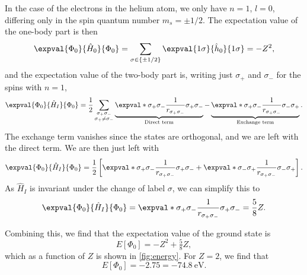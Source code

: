 In the case of the electrons in the helium atom, we only have $n = 1$, $l = 0$, differing only in the spin quantum number $m_s = \pm 1/2$.
The expectation value of the one-body part is then
\begin{equation*}
    \expval{\Phi_0}{\hat{H}_0}{\Phi_0} = \sum_{\sigma \in \{\pm 1/2\}} \expval{1\sigma}{\hat{h}_0}{1\sigma} = -Z^2,
\end{equation*}
and the expectation value of the two-body part is, writing just $\sigma_{+}$ and $\sigma_{-}$ for the spins with $n = 1$,
\begin{equation*}
    \expval{\Phi_0}{\hat{H}_I}{\Phi_0}
    = \frac{1}{2} \sum_{\substack{\sigma_{+}\sigma_{-}\\ \sigma_{+} \neq \sigma_{-}}}
    \underbrace{\expval*{\sigma_{+} \sigma_{-}}{\frac{1}{r_{\sigma_{+}\sigma_{-}}}}{\sigma_{+} \sigma_{-}}}_{\textnormal{Direct term}}
    - \underbrace{\expval*{\sigma_{+} \sigma_{-}}{\frac{1}{r_{\sigma_{+}\sigma_{-}}}}{\sigma_{-}\sigma_{+}}}_{\textnormal{Exchange term}}.
\end{equation*}
The exchange term vanishes since the states are orthogonal, and we are left with the direct term.
We are then just left with
\begin{equation*}
    \expval{\Phi_0}{\hat{H}_I}{\Phi_0} = \frac{1}{2}\left[ \expval*{\sigma_{+} \sigma_{-}}{\frac{1}{r_{\sigma_{+} \sigma_{-}}}}{\sigma_{+} \sigma_{-}} + \expval*{\sigma_{-} \sigma_{+}}{\frac{1}{r_{\sigma_{+} \sigma_{-}}}}{\sigma_{-} \sigma_{+}}\right].
\end{equation*}
As $\hat{H}_I$ is invariant under the change of label $\sigma$, we can simplify this to
\begin{equation*}
    \expval{\Phi_0}{\hat{H}_I}{\Phi_0} = \expval*{\sigma_{+} \sigma_{-}}{\frac{1}{r_{\sigma_{+} \sigma_{-}}}}{\sigma_{+} \sigma_{-}} = \frac{5}{8} Z.
\end{equation*}

Combining this, we find that the expectation value of the ground state is
\begin{equation}
    E[\Phi_0] = -Z^2 + \tfrac{5}{8}Z,
\end{equation}
which as a function of $Z$ is shown in \autoref{fig:energy}.
For $Z = 2$, we find that
\begin{equation}
    E[\Phi_0] = -2.75 = -74.8 \ \text{eV}.
\end{equation}

